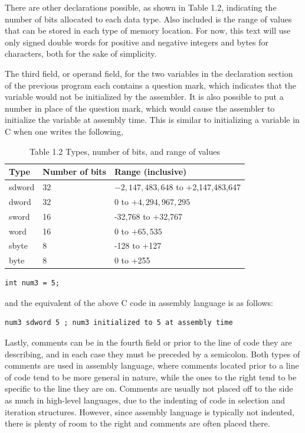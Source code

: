 \documentclass[10pt]{book}
\begin{document}
There are other declarations possible, as shown in Table 1.2, indicating the number of bits allocated to each data type. Also included is the range of values that can be stored in each type of memory location. For now, this text will use only signed double words for positive and negative integers and bytes for characters, both for the sake of simplicity.

The third field, or operand field, for the two variables in the declaration section of the previous program each contains a question mark, which indicates that the variable would not be initialized by the assembler. It is also possible to put a number in place of the question mark, which would cause the assembler to initialize the variable at assembly time. This is similar to initializing a variable in C when one writes the following,

\begin{table}[htbp]
\begin{center}
\captionsetup{labelformat=empty}
\caption{Table 1.2 Types, number of bits, and range of values}
\begin{tabular}{|l|l|l|}
\hline
Type & Number of bits & Range (inclusive) \\
\hline
sdword & 32 & $-2,147,483,648$ to +2,147,483,647 \\
\hline
dword & 32 & 0 to $+4,294,967,295$ \\
\hline
sword & 16 & -32,768 to +32,767 \\
\hline
word & 16 & 0 to $+65,535$ \\
\hline
sbyte & 8 & -128 to +127 \\
\hline
byte & 8 & 0 to +255 \\
\hline
\end{tabular}
\end{center}
\end{table}

\begin{verbatim}
int num3 = 5;
\end{verbatim}

and the equivalent of the above C code in assembly language is as follows:

\begin{verbatim}
num3 sdword 5 ; num3 initialized to 5 at assembly time
\end{verbatim}

Lastly, comments can be in the fourth field or prior to the line of code they are describing, and in each case they must be preceded by a semicolon. Both types of comments are used in assembly language, where comments located prior to a line of code tend to be more general in nature, while the ones to the right tend to be specific to the line they are on. Comments are usually not placed off to the side as much in high-level languages, due to the indenting of code in selection and iteration structures. However, since assembly language is typically not indented, there is plenty of room to the right and comments are often placed there.
\end{document}
